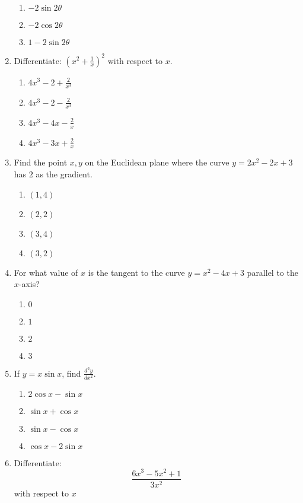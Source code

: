 \begin{multicols}{2}
\begin{enumerate}[label={\arabic*.}]
\begin{enumerate}[label={\Alph*.}]
            \item  \(-2\sin 2\theta\)
            \item  \(-2\cos 2\theta\)
            \item  \(1-2\sin 2\theta\)
        \end{enumerate}
  \item Differentiate: \(\left(x^2 + \frac{1}{x}\right)^2\) with respect to \(x\).
       \begin{enumerate}[label={\Alph*.}]
            \item \(4x^3 - 2 + \frac{2}{x^3}\)
            \item  \(4x^3 - 2 - \frac{2}{x^3}\)
            \item   \(4x^3 - 4x - \frac{2}{x}\)
            \item    \(4x^3 - 3x + \frac{2}{x}\)
        \end{enumerate}
\item Find the point \(x,y\) on the Euclidean plane where the curve \(y = 2x^{2} - 2x +3\) has \(2\) as the gradient.
    \begin{enumerate}[label={\Alph*.}]
        \item \((1, 4)\)
        \item \((2, 2)\)
        \item \((3, 4)\)
        \item \((3, 2)\)
    \end{enumerate}  
\item For what value of \(x\) is the tangent to the curve \(y = x^{2} - 4x + 3\) parallel to the \(x\)-axis?
    \begin{enumerate}[label={\Alph*.}]
        \item \(0\)
        \item \(1\)
        \item \(2\)
        \item \(3\)
    \end{enumerate}   
\item If \(y = x \sin x\), find \( \frac{d^2y}{dx^2} \).
	\begin{enumerate}[label={\Alph*.}]
	\item \(2\cos x - \sin x\)
	\item \(\sin x + \cos x\)
	\item \(\sin x  - \cos  x\)
	\item \( \cos x  - 2\sin x \)
	\end{enumerate}
\item Differentiate: \[\frac{6x^{3} - 5x^{2} + 1}{3x^{2}}\] with respect to \(x\)

\end{enumerate}
\end{multicols}
